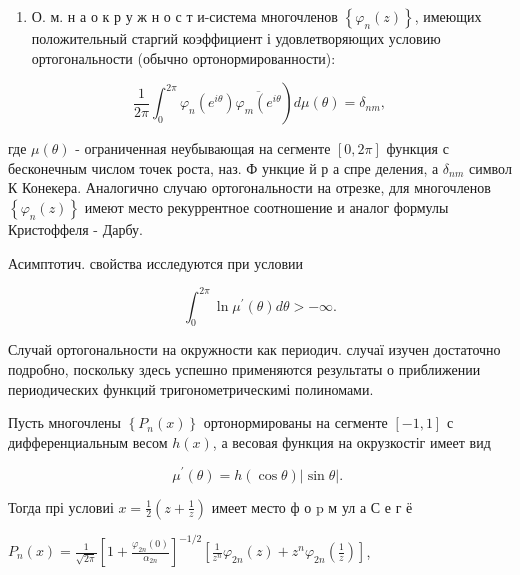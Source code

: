 \documentclass[10pt]{article}
\begin{document}
\begin{enumerate}

  \item О. м. н а о к р у ж н о с т и-система многочленов $\left\{\varphi_{n}(z)\right\}$, имеющих положительный старгий коэффициент і удовлетворяющих условию ортогональности (обычно ортонормированности):

\end{enumerate}



\[

\left.\frac{1}{2 \pi} \int_{0}^{2 \pi} \varphi_{n}\left(e^{i \theta}\right) \overline{\varphi_{m}\left(e^{i \theta}\right.}\right) d \mu(\theta)=\delta_{n m},

\]



где $\mu(\theta)$ - ограниченная неубывающая на сегменте $[0,2 \pi]$ функция с бесконечным числом точек роста, наз. Ф ункцие й р а спре деления, а $\delta_{n m}$ символ К Конекера. Аналогично случаю ортогональности на отрезке, для многочленов $\left\{\varphi_{n}(z)\right\}$ имеют место рекуррентное соотношение и аналог формулы Кристоффеля - Дарбу.



Асимптотич. свойства исследуются при условии



\[

\int_{0}^{2 \pi} \ln \mu^{\prime}(\theta) d \theta>-\infty .

\]



Случай ортогональности на окружности как периодич. случаї изучен достаточно подробно, поскольку здесь успешно применяются результаты о приближении периодических функций тригонометрическимі полиномами.



Пусть многочлены $\left\{P_{n}(x)\right\}$ ортонормированы на сегменте $[-1,1]$ с дифференциальным весом $h(x)$, а весовая функция на окрузкостіг имеет вид



\[

\mu^{\prime}(\theta)=h(\cos \theta)|\sin \theta| \text {. }

\]



Тогда прі условиі $x=\frac{1}{2}\left(z+\frac{1}{z}\right)$ имеет место ф о $\mathrm{p}$ м ул а С е г ё



$P_{n}(x)=\frac{1}{\sqrt{2 \pi}}\left[1+\frac{\varphi_{2 n}(0)}{\alpha_{2 n}}\right]^{-1 / 2}\left[\frac{1}{z^{n}} \varphi_{2 n}(z)+z^{n} \varphi_{2 n}\left(\frac{1}{z}\right)\right]$,
\end{document}
